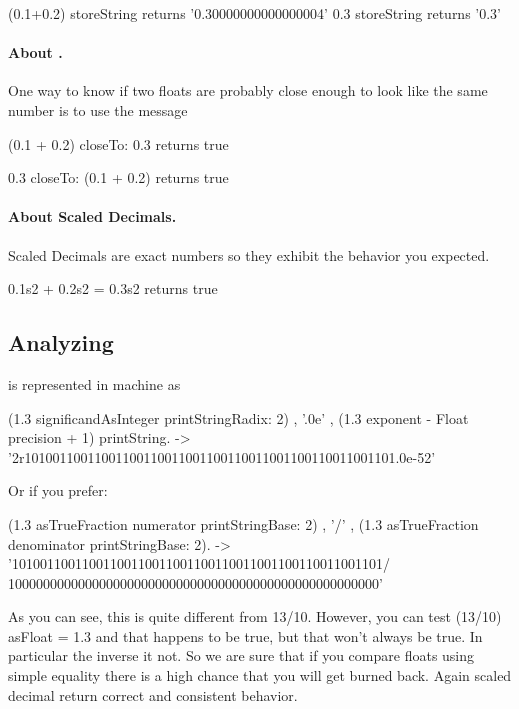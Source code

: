 \documentclass[a4paper,10pt,twoside]{book}
\begin{document}
\begin{code}{}
(0.1+0.2) storeString 
	returns 	'0.30000000000000004' 
0.3 storeString 
	returns	'0.3'
\end{code}	
		
\paragraph{About .} One way to know if two floats are probably close enough to look like the same number is to use the message 

\begin{code}{}
(0.1 + 0.2) closeTo: 0.3
	returns true

0.3 closeTo: (0.1 + 0.2)
	returns true
\end{code}		
		
		
\paragraph{About Scaled Decimals.}
Scaled Decimals are exact numbers so they exhibit the behavior you expected.

\begin{code}{}
0.1s2 + 0.2s2 = 0.3s2
	returns true
\end{code}		
		

\subsection{Analyzing }
 is represented in machine as

\begin{code}{}
(1.3 significandAsInteger printStringRadix: 2) , '.0e' , (1.3 exponent
- Float precision + 1) printString.
-> '2r10100110011001100110011001100110011001100110011001101.0e-52'
\end{code}

Or if you prefer:

\begin{code}{}
(1.3 asTrueFraction numerator printStringBase: 2) , '/' , (1.3
asTrueFraction denominator printStringBase: 2).
-> '10100110011001100110011001100110011001100110011001101/
10000000000000000000000000000000000000000000000000000'
\end{code}

As you can see, this is quite different from 13/10. However, you can test (13/10) asFloat = 1.3 and that happens to be true, but that won't always be true. In particular the inverse it not. So we are sure that if you compare floats using simple equality there is a high chance that you will get burned back. Again scaled decimal return correct and consistent behavior.
\end{document}
